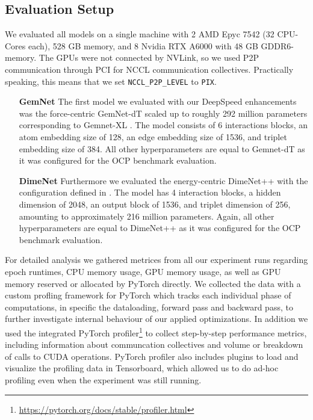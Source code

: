 \subsection{Evaluation Setup}

We evaluated all models on a single machine with 2 AMD Epyc 7542 (32 CPU-Cores each), 528 GB memory, 
and 8 Nvidia RTX A6000 with 48 GB GDDR6-memory. The GPUs were not connected by NVLink, so we used 
P2P communication through PCI for NCCL communication collectives. Practically speaking, this 
means that we set \texttt{NCCL\_P2P\_LEVEL} to \texttt{PIX}.

\begin{enumerate}[align=left]
    \item[\textbf{GemNet}] The first model we evaluated with our DeepSpeed enhancements was 
    the force-centric GemNet-dT scaled up to roughly 292 million parameters corresponding to 
    Gemnet-XL \cite*{https://doi.org/10.48550/arxiv.2203.09697}. 
    The model consists of 6 interactions blocks, an atom embedding size of 128, an edge 
    embedding size of 1536, and triplet embedding size of 384. All other hyperparameters are equal 
    to Gemnet-dT as it was configured for the OCP benchmark evaluation.

    \item[\textbf{DimeNet}] Furthermore we evaluated the energy-centric DimeNet++ with the configuration 
    defined in \cite*{https://doi.org/10.48550/arxiv.2203.09697}. The model has 4 interaction blocks, a hidden 
    dimension of 2048, an output block of 1536, and triplet dimension of 256, amounting to approximately 
    216 million parameters. Again, all other hyperparameters are equal to DimeNet++ as it was configured 
    for the OCP benchmark evaluation.
\end{enumerate}

For detailed analysis we gathered metrices from all our experiment runs regarding epoch runtimes, 
CPU memory usage, GPU memory usage, as well as GPU memory reserved or allocated by PyTorch directly.
We collected the data with a custom profling framework for PyTorch which tracks each individual phase 
of computations, in specific the dataloading, forward pass and backward pass, to further investigate 
internal behaviour of our applied optimizations. 
In addition we used the integrated PyTorch profiler\footnote{\url{https://pytorch.org/docs/stable/profiler.html}}
to collect step-by-step performance metrics, including information about communcation collectives and 
volume or breakdown of calls to CUDA operations. PyTorch profiler also includes plugins to 
load and visualize the profiling data in Tensorboard, which allowed us to do ad-hoc profiling 
even when the experiment was still running.



